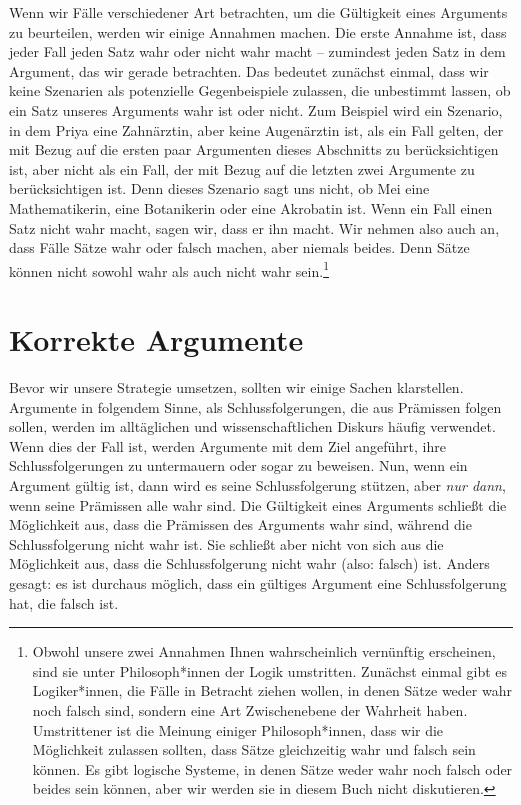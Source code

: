Wenn wir Fälle verschiedener Art betrachten, um die Gültigkeit eines Arguments zu beurteilen, werden wir einige Annahmen machen. Die erste Annahme ist, dass jeder Fall jeden Satz wahr oder nicht wahr macht -- zumindest jeden Satz in dem Argument, das wir gerade betrachten. Das bedeutet zunächst einmal, dass wir keine Szenarien als potenzielle Gegenbeispiele zulassen, die unbestimmt lassen, ob ein Satz unseres Arguments wahr ist oder nicht. Zum Beispiel wird ein Szenario, in dem Priya eine Zahnärztin, aber keine Augenärztin ist, als ein Fall gelten, der mit Bezug auf die ersten paar Argumenten dieses Abschnitts zu berücksichtigen ist, aber nicht als ein Fall, der mit Bezug auf die letzten zwei Argumente zu berücksichtigen ist. Denn dieses Szenario sagt uns nicht, ob Mei eine Mathematikerin, eine Botanikerin oder eine Akrobatin ist. Wenn ein Fall einen Satz nicht wahr macht, sagen wir, dass er ihn  macht. Wir nehmen also auch an, dass Fälle Sätze wahr oder falsch machen, aber niemals beides. Denn Sätze können nicht sowohl wahr als auch nicht wahr sein.\footnote{Obwohl unsere zwei Annahmen Ihnen wahrscheinlich vernünftig erscheinen, sind sie unter Philosoph*innen der Logik umstritten. Zunächst einmal gibt es Logiker*innen, die Fälle in Betracht ziehen wollen, in denen Sätze weder wahr noch falsch sind, sondern eine Art Zwischenebene der Wahrheit haben. Umstrittener ist die Meinung einiger Philosoph*innen, dass wir die Möglichkeit zulassen sollten, dass Sätze gleichzeitig wahr und falsch sein können. Es gibt logische Systeme, in denen Sätze weder wahr noch falsch oder beides sein können, aber wir werden sie in diesem Buch nicht diskutieren.}

\section{Korrekte Argumente}

Bevor wir unsere Strategie umsetzen, sollten wir einige Sachen klarstellen. Argumente in folgendem Sinne, als Schlussfolgerungen, die aus Prämissen folgen sollen, werden im alltäglichen und wissenschaftlichen Diskurs häufig verwendet. Wenn dies der Fall ist, werden Argumente mit dem Ziel angeführt, ihre Schlussfolgerungen zu untermauern oder sogar zu beweisen. Nun, wenn ein Argument gültig ist, dann wird es seine Schlussfolgerung stützen, aber \emph{nur dann}, wenn seine Prämissen alle wahr sind. Die Gültigkeit eines Arguments schlie{\ss}t die Möglichkeit aus, dass die Prämissen des Arguments wahr sind, während die Schlussfolgerung nicht wahr ist. Sie schlie{\ss}t aber nicht von sich aus die Möglichkeit aus, dass die Schlussfolgerung nicht wahr (also: falsch) ist.  Anders gesagt: es ist durchaus möglich, dass ein gültiges Argument eine Schlussfolgerung hat, die falsch ist.

